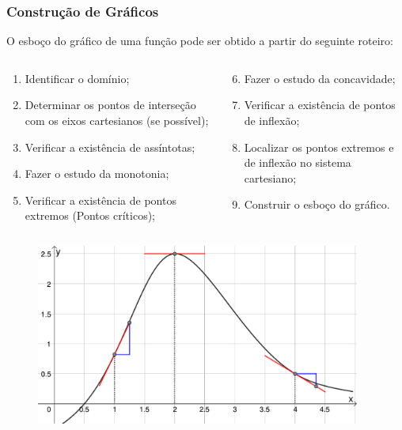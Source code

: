 \begin{frame}
  \frametitle{Construção de Gráficos}
  O esboço do gráfico de uma função pode ser obtido a partir do seguinte roteiro:
  \begin{columns}[onlytextwidth]
    \begin{column}{0.48\textwidth}
      \begin{enumerate}
        \item Identificar o domínio;
        \item Determinar os pontos de interseção com os eixos cartesianos (se possível);
        \item Verificar a existência de assíntotas;
        \item Fazer o estudo da monotonia;
        \item Verificar a existência de pontos extremos (Pontos críticos);
      \end{enumerate}
    \end{column}
    \begin{column}{0.48\textwidth}
      \begin{enumerate}\setcounter{enumi}{5}
        \item Fazer o estudo da concavidade;
        \item Verificar a existência de pontos de inflexão;
        \item Localizar os pontos extremos e de inflexão no sistema cartesiano;
        \item Construir o esboço do gráfico.
      \end{enumerate}
    \end{column}
  \end{columns}
\end{frame}

\begin{frame}
  \begin{figure}
    \includegraphics[width=0.95\textwidth]{figuras/figura4.pdf}
  \end{figure}
\end{frame}

